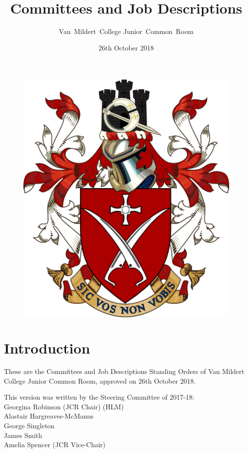 \documentclass[12pt]{article}  %
\title{Committees and Job Descriptions}
\author{Van~Mildert~College Junior~Common~Room}
\date{26th October 2018}
\begin{document}
\begin{titlepage}  %
\maketitle
\begin{figure}[h]
\includegraphics[scale=0.25]{arms}  %
\centering
\end{figure}
\thispagestyle{empty}
\end{titlepage}

\setcounter{page}{2}  %
\section*{Introduction}
These are the Committees and Job Descriptions Standing Orders of Van Mildert College Junior Common Room, approved on 26th October 2018.

This version was written by the Steering Committee of 2017-18:\\
\hspace*{2cm}Georgina Robinson (JCR Chair) (HLM)\\
\hspace*{2cm}Alastair Hargreaves-McManus\\
\hspace*{2cm}George Singleton\\
\hspace*{2cm}James Smith\\
\hspace*{2cm}Amelia Spencer (JCR Vice-Chair)
\end{document}

